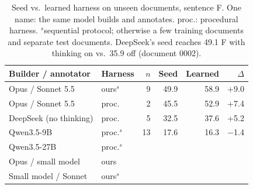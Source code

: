 \begin{table}[t]
\centering\small
\setlength{\tabcolsep}{2pt}
\begin{tabular}{@{}llrrrr@{}}
\toprule
Builder / annotator & Harness & $n$ & Seed & Learned & $\Delta$ \\
\midrule
Opus / Sonnet 5.5 & ours$^s$ & 9 & 49.9 & 58.9 & +9.0 \\
Opus / Sonnet 5.5 & proc. & 2 & 45.5 & 52.9 & +7.4 \\
DeepSeek (no thinking) & proc. & 5 & 32.5 & 37.6 & +5.2 \\
Qwen3.5-9B & proc.$^s$ & 13 & 17.6 & 16.3 & $-$1.4 \\
\midrule
Qwen3.5-27B & proc.$^s$ & \gapcell{} & \gapcell{} & \gapcell{} & \gapcell{} \\
Opus / small model & ours & \gapcell{} & \gapcell{} & \gapcell{} & \gapcell{} \\
Small model / Sonnet & ours$^s$ & \gapcell{} & \gapcell{} & \gapcell{} & \gapcell{} \\
\bottomrule
\end{tabular}
\caption{Seed vs.\ learned harness on unseen documents, sentence F. One name: the same model builds and annotates. proc.: procedural harness. $^s$sequential protocol; otherwise a few training documents and separate test documents. DeepSeek's seed reaches 49.1 F with thinking on vs.\ 35.9 off (document 0002).}
\label{tab:models}
\end{table}
